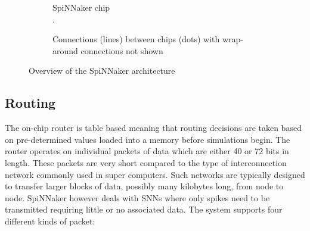 			\begin{figure}
				\center
				\begin{subfigure}[b]{0.49\textwidth}
					\center
					
					\caption{SpiNNaker chip\\\color{white}.}
					\label{fig:spinnaker-chip}
				\end{subfigure}
				\begin{subfigure}[b]{0.49\textwidth}
					\center
					
					\caption{Connections (lines) between chips (dots) with wrap-around
					connections not shown}
					\label{fig:spinnaker-chips}
				\end{subfigure}
				
				\caption{Overview of the SpiNNaker architecture}
				\label{fig:spinnaker-architecture}
			\end{figure}
		
		\subsection{Routing}
			
			
			The on-chip router is table based meaning that routing decisions are taken
			based on pre-determined values loaded into a memory before simulations
			begin. The router operates on individual packets of data which are either
			40 or 72 bits in length. These packets are very short compared to the type
			of interconnection network commonly used in super computers. Such networks
			are typically designed to transfer larger blocks of data, possibly many
			kilobytes long, from node to node. SpiNNaker however deals with SNNs where
			only spikes need to be transmitted requiring little or no associated data.
			The system supports four different kinds of packet:
			
